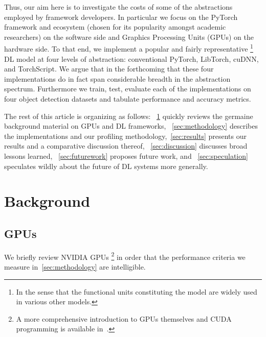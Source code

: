 \documentclass[sigconf]{acmart}
\begin{document}
Thus, our aim here is to investigate the costs of some of the abstractions employed by framework developers.
In particular we focus on the PyTorch framework and ecosystem (chosen for its popularity amongst academic researchers) on the software side and Graphics Processing Units (GPUs) on the hardware side.
To that end, we implement a popular and fairly representative%
\footnote{In the sense that the functional units constituting the model are widely used in various other models.}
DL model at four levels of abstraction: conventional PyTorch, LibTorch, cuDNN, and TorchScript.
We argue that in the forthcoming that these four implementations do in fact span considerable breadth in the abstraction spectrum.
Furthermore we train, test, evaluate each of the implementations on four object detection datasets and tabulate performance and accuracy metrics.

The rest of this article is organizing as follows: ~\cref{sec:background} quickly reviews the germaine background material on GPUs and DL frameworks, ~\cref{sec:methodology} describes the implementations and our profiling methodology,~\cref{sec:results} presents our results and a comparative discussion thereof, ~\cref{sec:discussion} discusses broad lessons learned, ~\cref{sec:futurework} proposes future work, and ~\cref{sec:speculation} speculates wildly about the future of DL systems more generally.


\section{Background}\label{sec:background}
\subsection{GPUs}\label{subsec:gpus}

We briefly review NVIDIA GPUs%
\footnote{A more comprehensive introduction to GPUs themselves and CUDA programming is available in~\cite{10.5555/2935593}.}
in order that the performance criteria we measure in~\cref{sec:methodology} are intelligible.
\end{document}

